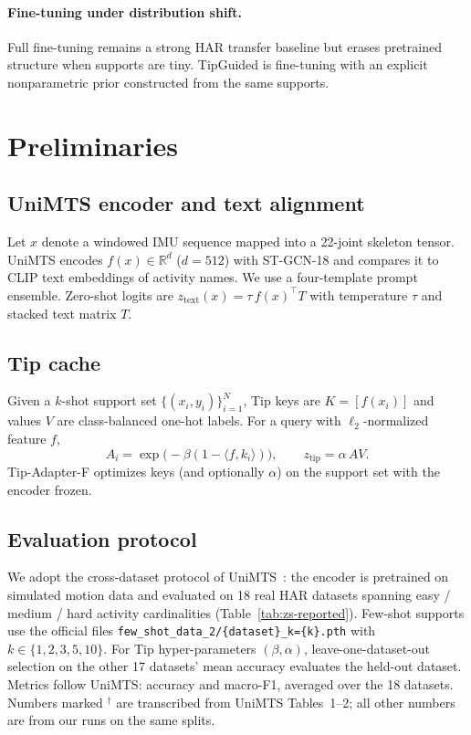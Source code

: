 \documentclass[11pt]{article}
\begin{document}
\paragraph{Fine-tuning under distribution shift.}
Full fine-tuning remains a strong HAR transfer baseline but erases pretrained structure when supports are tiny.
TipGuided is fine-tuning with an explicit nonparametric prior constructed from the same supports.

\section{Preliminaries}
\label{sec:prelim}

\subsection{UniMTS encoder and text alignment}
Let \(x\) denote a windowed IMU sequence mapped into a 22-joint skeleton tensor.
UniMTS encodes \(f(x)\in\mathbb{R}^{d}\) (\(d{=}512\)) with ST-GCN-18 and compares it to CLIP text embeddings of activity names.
We use a four-template prompt ensemble.
Zero-shot logits are \(z_{\mathrm{text}}(x)=\tau\,f(x)^{\top}T\) with temperature \(\tau\) and stacked text matrix \(T\).

\subsection{Tip cache}
Given a \(k\)-shot support set \(\{(x_i,y_i)\}_{i=1}^{N}\), Tip keys are \(K=[f(x_i)]\) and values \(V\) are class-balanced one-hot labels.
For a query with \(\ell_2\)-normalized feature \(f\),
\[
A_{i}=\exp\!\big(-\beta(1-\langle f,k_i\rangle)\big),\qquad
z_{\mathrm{tip}}=\alpha\,AV.
\]
Tip-Adapter-F optimizes keys (and optionally \(\alpha\)) on the support set with the encoder frozen.

\subsection{Evaluation protocol}
We adopt the cross-dataset protocol of UniMTS~\cite{unimts}: the encoder is pretrained on simulated motion data and evaluated on 18 real HAR datasets spanning easy / medium / hard activity cardinalities (Table~\ref{tab:zs-reported}).
Few-shot supports use the official files \texttt{few\_shot\_data\_2/\{dataset\}\_k=\{k\}.pth} with \(k\in\{1,2,3,5,10\}\).
For Tip hyper-parameters \((\beta,\alpha)\), leave-one-dataset-out selection on the other 17 datasets' mean accuracy evaluates the held-out dataset.
Metrics follow UniMTS: accuracy and macro-F1, averaged over the 18 datasets.
Numbers marked $^\dagger$ are transcribed from UniMTS Tables~1--2; all other numbers are from our runs on the same splits.
\end{document}
